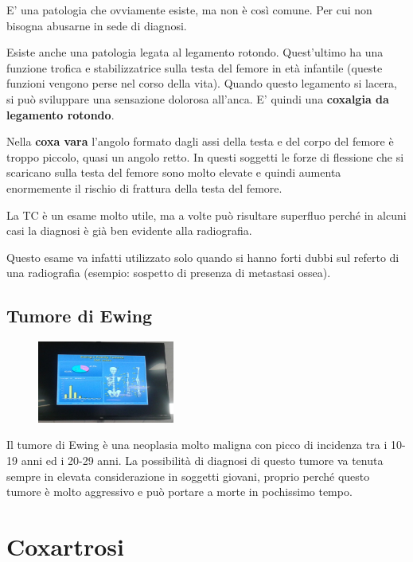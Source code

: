 E' una patologia che ovviamente esiste, ma non è così comune. Per cui non bisogna abusarne in sede di diagnosi.

Esiste anche una patologia legata al legamento rotondo. Quest'ultimo ha una funzione trofica e stabilizzatrice sulla testa del femore in età infantile (queste funzioni vengono perse nel corso della vita). Quando questo legamento si lacera, si può sviluppare una sensazione dolorosa all'anca. E' quindi una \textbf{coxalgia da legamento rotondo}.

Nella \textbf{coxa vara} l'angolo formato dagli assi della testa e del corpo del femore è troppo piccolo, quasi un angolo retto. In questi soggetti le forze di flessione che si scaricano sulla testa del femore sono molto elevate e quindi aumenta enormemente il rischio di frattura della testa del femore.

La TC è un esame molto utile, ma a volte può risultare superfluo perché in alcuni casi la diagnosi è già ben evidente alla radiografia.

Questo esame va infatti utilizzato solo quando si hanno forti dubbi sul referto di una radiografia (esempio: sospetto di presenza di metastasi ossea).

\subsection{Tumore di Ewing}

\begin{figure}[!ht]
\centering
\includegraphics[width=0.4\textwidth]{019/image1.jpeg}
\end{figure}

Il tumore di Ewing è una neoplasia molto maligna con picco di incidenza tra i 10-19 anni ed i 20-29 anni. La possibilità di diagnosi di questo tumore va tenuta sempre in elevata considerazione in soggetti giovani, proprio perché questo tumore è molto aggressivo e può portare a morte in pochissimo tempo.

\section{Coxartrosi}

